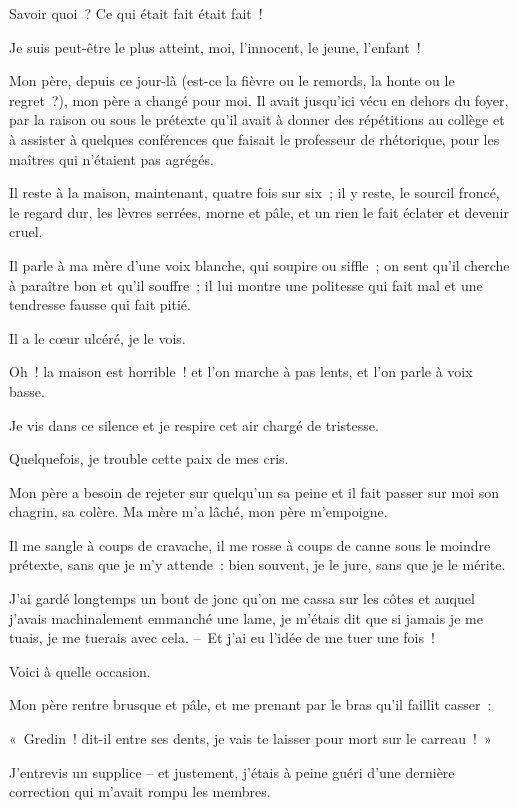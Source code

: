 \documentclass[french,twoside]{book} %
\begin{document}
Savoir quoi ? Ce qui était fait était fait !\par
\bigbreak
\noindent Je suis peut-être le plus atteint, moi, l’innocent, le jeune, l’enfant !\par
Mon père, depuis ce jour-là (est-ce la fièvre ou le remords, la honte ou le regret ?), mon père a changé pour moi. Il avait jusqu’ici vécu en dehors du foyer, par la raison ou sous le prétexte qu’il avait à donner des répétitions au collège et à assister à quelques conférences que faisait le professeur de rhétorique, pour les maîtres qui n’étaient pas agrégés.\par
Il reste à la maison, maintenant, quatre fois sur six ; il y reste, le sourcil froncé, le regard dur, les lèvres serrées, morne et pâle, et un rien le fait éclater et devenir cruel.\par
Il parle à ma mère d’une voix blanche, qui soupire ou siffle ; on sent qu’il cherche à paraître bon et qu’il souffre ; il lui montre une politesse qui fait mal et une tendresse fausse qui fait pitié.\par
Il a le cœur ulcéré, je le vois.\par
Oh ! la maison est horrible ! et l’on marche à pas lents, et l’on parle à voix basse.\par
Je vis dans ce silence et je respire cet air chargé de tristesse.\par
Quelquefois, je trouble cette paix de mes cris.\par
Mon père a besoin de rejeter sur quelqu’un sa peine et il fait passer sur moi son chagrin, sa colère. Ma mère m’a lâché, mon père m’empoigne.\par
Il me sangle à coups de cravache, il me rosse à coups de canne sous le moindre prétexte, sans que je m’y attende : bien souvent, je le jure, sans que je le mérite.\par
J’ai gardé longtemps un bout de jonc qu’on me cassa sur les côtes et auquel j’avais machinalement emmanché une lame, je m’étais dit que si jamais je me tuais, je me tuerais avec cela. – Et j’ai eu l’idée de me tuer une fois !\par
Voici à quelle occasion.\par
\bigbreak
\noindent Mon père rentre brusque et pâle, et me prenant par le bras qu’il faillit casser :\par
« Gredin ! dit-il entre ses dents, je vais te laisser pour mort sur le carreau ! »\par
J’entrevis un supplice – et justement, j’étais à peine guéri d’une dernière correction qui m’avait rompu les membres.\par
\end{document}
